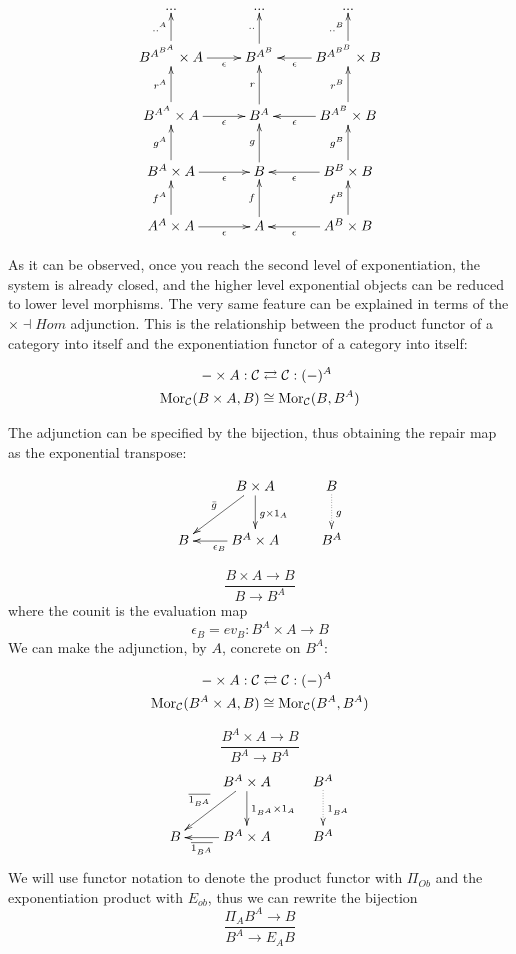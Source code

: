 \documentclass[aps,twocolumn]{revtex4-1}
\begin{document}
$$
			\xymatrix{
			 ... & ... & ... \\
			  B^{A^{B^A}} \times A \ar[r]_-{\epsilon} \ar[u]^-{..^A} & B^{A^B} \ar[u]^-{..} & B^{A^{B^B}} \times B\ar[l]^-{\epsilon}\ar[u]^-{..^B} \\
			 B^{A^A} \times A \ar[r]_-{\epsilon} \ar[u]^-{r^A} & B^A \ar[u]^-{r} & B^{A^B} \times B\ar[l]^-{\epsilon}\ar[u]^-{r^B} \\
			B^A \times A \ar[r]_-{\epsilon} \ar[u]^-{g^A} & B \ar[u]^-{g} & B^B \times B\ar[l]^-{\epsilon}\ar[u]^-{g^B} \\
			A^A \times A \ar[r]_-{\epsilon} \ar[u]^-{f^A} & 
			A\ar[u]^-{f} & A^B\times B\ar[l]^-{\epsilon}\ar[u]^-{f^B} }
			$$

As it can be observed, once you reach the second level of exponentiation, the system is already closed, and the higher level exponential objects can be reduced to lower level morphisms. The very same feature can be explained in terms of the $\times \dashv Hom$ adjunction. This is the relationship between the product functor of a category into itself and the exponentiation functor of a category into itself:

\begin{align*}
- \times A: \mathcal{C} & \rightleftarrows \mathcal{C}: (-)^A\\
\mathop{\rm Mor}\nolimits_{\mathcal{C}}(B \times A, B) & \cong  \mathop{\rm Mor}\nolimits_{\mathcal{C}}(B, B^A)
\end{align*}

The adjunction can be specified by the bijection, thus obtaining the repair map as the exponential transpose:

			$$
			\xymatrix{
			& B \times A \ar[d]^{g \times 1_A} \ar[dl]_{\bar{g}} & B \ar@{.>}[d]^{g}\\
			B & B^A \times A \ar[l]^{\epsilon_B} & B^A}
			$$
	
		$$
			\frac{B \times A \longrightarrow B}{B \longrightarrow B^A}
		$$
where the counit is the evaluation map
		$$
			\epsilon_B = ev_B \colon B^A \times A \longrightarrow B
		$$
We can make the adjunction, by $A$, concrete on $B^A$:

\begin{align*}
- \times A: \mathcal{C} & \rightleftarrows \mathcal{C}: (-)^A\\
\mathop{\rm Mor}\nolimits_{\mathcal{C}}(B^A \times A, B) & \cong  \mathop{\rm Mor}\nolimits_{\mathcal{C}}(B^A, B^A)
\end{align*}

	$$
			\frac{B^A \times A \longrightarrow B}{B^A \longrightarrow B^A}
		$$
				$$
			\xymatrix{
			& B^A \times A \ar[d]^{1_{B^A} \times 1_A} \ar[dl]_{\overline{1_{B^A}}} & B^A \ar@{.>}[d]^{1_{B^A}}\\
			B & B^A \times A \ar[l]^-{\overline{1_{B^A}}} & B^A}
			$$
We will use functor notation to denote the product functor with $\Pi_{Ob}$ and the exponentiation product with $E_{ob}$, thus we can rewrite the bijection
		$$
			\frac{ \Pi_A B^A \longrightarrow B}{B^A \longrightarrow E_A B}
		$$
\end{document}
